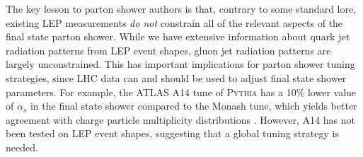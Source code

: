 \documentclass[11pt]{cernrep}
\begin{document}
The key lesson to parton shower authors is that, contrary to some standard lore, existing LEP measurements \emph{do not} constrain all of the relevant aspects of the final state parton shower.  While we have extensive information about quark jet radiation patterns from LEP event shapes, gluon jet radiation patterns are largely unconstrained.  This has important implications for parton shower tuning strategies, since LHC data can and should be used to adjust final state shower parameters.  For example, the ATLAS A14 tune of \textsc{Pythia} has a 10\% lower value of $\alpha_s$ in the final state shower compared to the Monash tune, which yields better agreement with charge particle multiplicity distributions \cite{Aad:2016oit}.  However, A14 has not been tested on LEP event shapes, suggesting that a global tuning strategy is needed. 
\end{document}
